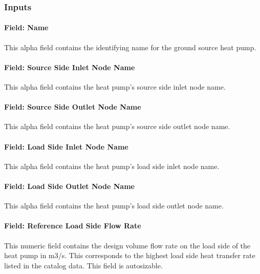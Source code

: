 \subsubsection{Inputs}\label{inputs-12-012}

\paragraph{Field: Name}\label{field-name-11-010}

This alpha field contains the identifying name for the ground source heat pump.

\paragraph{Field: Source Side Inlet Node Name}\label{field-source-side-inlet-node-name}

This alpha field contains the heat pump's source side inlet node name.

\paragraph{Field: Source Side Outlet Node Name}\label{field-source-side-outlet-node-name}

This alpha field contains the heat pump's source side outlet node name.

\paragraph{Field: Load Side Inlet Node Name}\label{field-load-side-inlet-node-name}

This alpha field contains the heat pump's load side inlet node name.

\paragraph{Field: Load Side Outlet Node Name}\label{field-load-side-outlet-node-name}

This alpha field contains the heat pump's load side outlet node name.

\paragraph{Field: Reference Load Side Flow Rate}\label{field-rated-load-side-flow-rate}

This numeric field contains the design volume flow rate on the load side of the heat pump in m3/s. This corresponds to the highest load side heat transfer rate listed in the catalog data. This field is autosizable.

